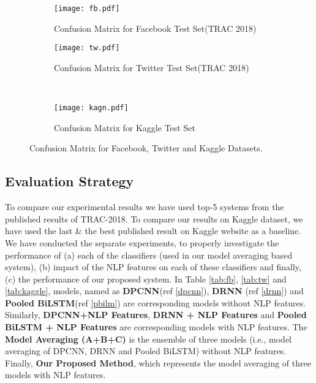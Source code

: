 \documentclass[sigconf]{acmart}
\begin{document}
\begin{figure*}[h]
        \begin{subfigure}[b]{0.5\textwidth}
                \texttt{[image: fb.pdf]}
                \caption{Confusion Matrix for Facebook Test Set(TRAC 2018)}
                \label{fig:fbconf}
 \end{subfigure}\begin{subfigure}[b]{0.5\textwidth}
                \texttt{[image: tw.pdf]}
                \caption{Confusion Matrix for Twitter Test Set(TRAC 2018)}
                \label{fig:twconf}
  \end{subfigure}\\
     \begin{subfigure}[b]{0.5\linewidth}
                \texttt{[image: kagn.pdf]}
                \caption{Confusion Matrix for Kaggle Test Set}
                \label{fig:kagconf}
      \vspace{-1em}
      \end{subfigure}\caption{Confusion Matrix for Facebook, Twitter and Kaggle Datasets.}\label{fig:conf}
        \vspace{-4mm}
\end{figure*}
\subsection{Evaluation Strategy}
To compare our experimental results we have used top-5 systems from the published results of TRAC-2018\cite{kumar2018proceedings}. To compare our results on Kaggle dataset, we have used the last \& the best published result on Kaggle website as a baseline. We have conducted the separate experiments, to properly investigate the performance of (a) each of the classifiers (used in our model averaging based system), (b) impact of the NLP features on each of these classifiers and finally, (c) the performance of our proposed system. In Table \ref{tab:fb}, \ref{tab:tw} and \ref{tab:kaggle}, models, named as \textbf{DPCNN}(ref \ref{dpcnn}), \textbf{DRNN} (ref \ref{drnn}) and \textbf{Pooled BiLSTM}(ref \ref{pbilm}) are corresponding models without NLP features. Similarly, \textbf{DPCNN+NLP Features}, \textbf{DRNN + NLP Features} and \textbf{Pooled BiLSTM + NLP Features} are corresponding models with NLP features. The \textbf{Model Averaging (A+B+C)} is the ensemble of three models (i.e., model averaging of DPCNN, DRNN and Pooled BiLSTM) without NLP features. Finally, \textbf{Our Proposed Method}, which represents the model averaging of three models with NLP features. 
\end{document}
